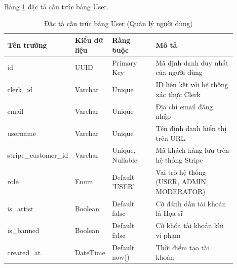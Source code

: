 Bảng \ref{table:4_1} đặc tả cấu trúc bảng User.
\begin{table}[h!]
    \caption{Đặc tả cấu trúc bảng User (Quản lý người dùng)}
    \label{table:4_1}
\centering
\small
\renewcommand{\arraystretch}{1.2}
\begin{tabular}{|p{0.2\linewidth}|p{0.15\linewidth}|p{0.2\linewidth}|p{0.37\linewidth}|}
\hline
\textbf{Tên trường} & \textbf{Kiểu dữ liệu} & \textbf{Ràng buộc} & \textbf{Mô tả} \\ \hline
id & UUID & Primary Key & Mã định danh duy nhất của người dùng \\ \hline
clerk\_id & Varchar & Unique & ID liên kết với hệ thống xác thực Clerk \\ \hline
email & Varchar & Unique & Địa chỉ email đăng nhập \\ \hline
username & Varchar & Unique & Tên định danh hiển thị trên URL \\ \hline
stripe\_customer\_id & Varchar & Unique, Nullable & Mã khách hàng lưu trên hệ thống Stripe \\ \hline
role & Enum & Default 'USER' & Vai trò hệ thống (USER, ADMIN, MODERATOR) \\ \hline
is\_artist & Boolean & Default false & Cờ đánh dấu tài khoản là Họa sĩ \\ \hline
is\_banned & Boolean & Default false & Cờ khóa tài khoản khi vi phạm \\ \hline
created\_at & DateTime & Default now() & Thời điểm tạo tài khoản \\ \hline
\end{tabular}
\end{table}
\FloatBarrier

